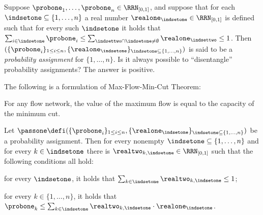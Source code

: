 Suppose $\probone_1,\ldots,\probone_n\in\RRN_{[0,1]}$, and suppose that for
each $\indsetone\subseteq\{1,\ldots,n\}$ a real number
$\realone_\indsetone\in\RRN_{[0,1]}$ is defined such that for every such
$\indsetone$ it holds that
$\sum_{i\in\indsetone}\probone_i\leq\sum_{\indsettwo\cap\indsetone\neq\emptyset}
\realone_\indsettwo\leq 1$. Then $(\{\probone_i\}_{1\leq i\leq
  n},\{\realone_\indsetone\}_{\indsetone\subseteq\{1,\ldots,n\}})$ is said
to be a \emph{probability assignment} for $\{1,\ldots,n\}$.
Is it always possible to ``disentangle'' probability assignments? The
answer is positive. 

The following is a formulation of Max-Flow-Min-Cut Theorem:
\begin{theorem}\label{t:mf-mc}
  For any flow network, the value of the maximum flow is equal to the
  capacity of the minimum cut.
\end{theorem}
\begin{lemma}\label{lemma:disentangling}
  Let $\passone\defi(\{\probone_i\}_{1\leq i\leq n},\{\realone_\indsetone\}_{\indsetone\subseteq\{1,\ldots,n\}})$
  be a probability assignment.
  Then for every nonempty $\indsetone\subseteq\{1,\ldots,n\}$ and
  for every $k\in\indsetone$ there is $\realtwo_{k,\indsetone}\in\RRN_{[0,1]}$ such that
  the following conditions all hold:
  \begin{varenumerate}
  \item\label{point:first}
      for every $\indsetone$, it holds that $\sum_{k\in\indsetone}\realtwo_{k,\indsetone}\leq 1$;
    \item\label{point:second}
      for every $k\in\{1,\ldots,n\}$, it holds that $\probone_k\leq\sum_{k\in\indsetone}
      \realtwo_{k,\indsetone}\cdot\realone_\indsetone$.
  \end{varenumerate}
\end{lemma}
